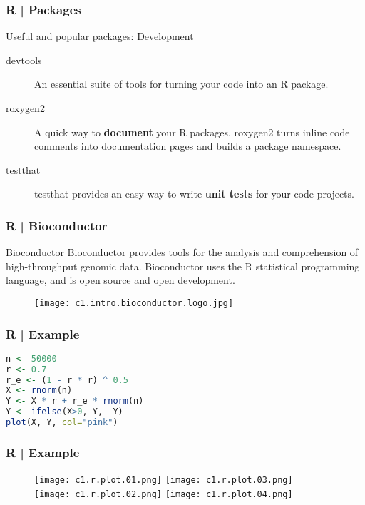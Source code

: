 \begin{frame}
  \frametitle{R | Packages}
  \begin{block}{Useful and popular packages: Development}
    \begin{description}
      \item[devtools] An essential suite of tools for turning your code into an R package.
      \item[roxygen2] A quick way to \textbf{document} your R packages. roxygen2 turns inline code comments into documentation pages and builds a package namespace.
      \item[testthat] testthat provides an easy way to write \textbf{unit tests} for your code projects.
    \end{description}
  \end{block}
\end{frame}

\begin{frame}
  \frametitle{R | Bioconductor}
  \begin{block}{Bioconductor}
    Bioconductor provides tools for the analysis and comprehension of high-throughput genomic data. Bioconductor uses the R statistical programming language, and is open source and open development.
  \end{block}
  \begin{figure}
    \centering
    \texttt{[image: c1.intro.bioconductor.logo.jpg]}
  \end{figure}
\end{frame}

\begin{frame}[fragile]
  \frametitle{R | Example}
\begin{lstlisting}[language=R]
n <- 50000
r <- 0.7
r_e <- (1 - r * r) ^ 0.5
X <- rnorm(n)
Y <- X * r + r_e * rnorm(n)
Y <- ifelse(X>0, Y, -Y)
plot(X, Y, col="pink")
\end{lstlisting}
\end{frame}

\begin{frame}
  \frametitle{R | Example}
  \begin{figure}
    \centering
    \texttt{[image: c1.r.plot.01.png]}\qquad
    \texttt{[image: c1.r.plot.03.png]}\\
    \texttt{[image: c1.r.plot.02.png]}
    \hspace{4em}
    \texttt{[image: c1.r.plot.04.png]}
  \end{figure}
\end{frame}

